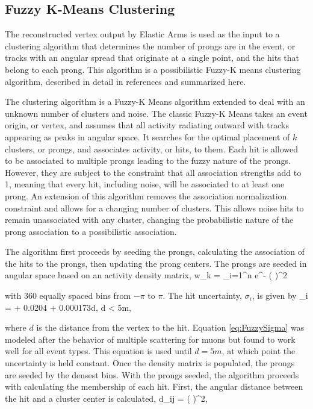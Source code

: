 \subsection{Fuzzy K-Means Clustering}

The reconstructed vertex output by Elastic Arms is used as the input to a clustering algorithm that determines the number of prongs are in the event, or tracks with an angular spread that originate at a single point, and the hits that belong to each prong. This algorithm is a possibilistic Fuzzy-K means clustering algorithm, described in detail in references \cite{ref:TNFuzzyK, ref:ThesisEvan} and summarized here.

The clustering algorithm is a Fuzzy-K Means algorithm extended to deal with an unknown number of clusters and noise. The classic Fuzzy-K Means \cite{ref:RecoFuzzy1, ref:RecoFuzzy2} takes an event origin, or vertex, and assumes that all activity radiating outward with tracks appearing as peaks in angular space. It searches for the optimal placement of $k$ clusters, or prongs, and associates activity, or hits, to them. Each hit is allowed to be associated to multiple prongs leading to the fuzzy nature of the prongs. However, they are subject to the constraint that all association strengths add to 1, meaning that every hit, including noise, will be associated to at least one prong. An extension of this algorithm \cite{ref:RecoFuzzyExt} removes the association normalization constraint and allows for a changing number of clusters. This allows noise hits to remain unassociated with any cluster, changing the probabilistic nature of the prong association to a possibilistic association.

The algorithm first proceeds by seeding the prongs, calculating the association of the hits to the prongs, then updating the prong centers. The prongs are seeded in angular space based on an activity density matrix,
\beq
w_k = \sum_{i=1}^n e^{- \left(  \right)^2}
\label{eq:FuzzyDensity}
\eeq

\n with $360$ equally spaced bins from $-\pi$ to $\pi$. The hit uncertainty, $\sigma_i$, is given by
\beq
\sigma_i =  + 0.0204 + 0.000173d, \quad d < 5\unit{m},
\label{eq:FuzzySigma}
\eeq

\n where $d$ is the distance from the vertex to the hit. Equation \ref{eq:FuzzySigma} was modeled after the behavior of multiple scattering for muons but found to work well for all event types. This equation is used until $d = 5\unit{m}$, at which point the uncertainty is held constant. Once the density matrix is populated, the prongs are seeded by the densest bins. With the prongs seeded, the algorithm proceeds with calculating the membership of each hit. First, the angular distance between the hit and a cluster center is calculated,
\beq
d_{ij} = \left(  \right)^2,
\label{eq:Fuzzyd}
\eeq

